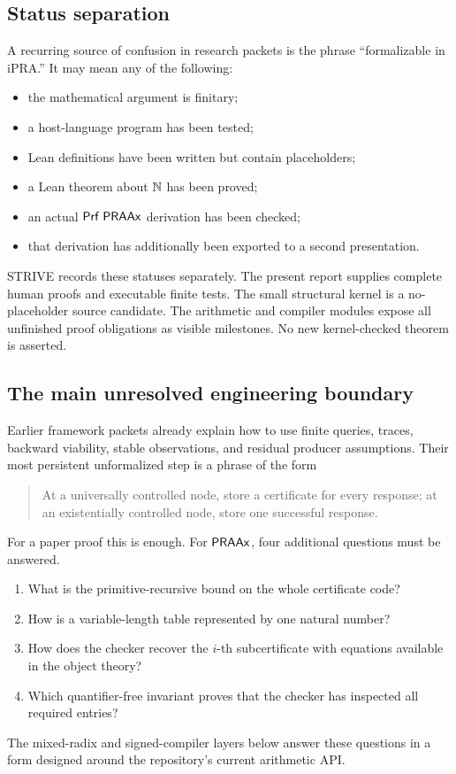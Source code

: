 \subsection{Status separation}

A recurring source of confusion in research packets is the phrase
``formalizable in iPRA.''  It may mean any of the following:

\begin{itemize}
\item the mathematical argument is finitary;
\item a host-language program has been tested;
\item Lean definitions have been written but contain placeholders;
\item a Lean theorem about \(\mathbb N\) has been proved;
\item an actual \(\mathsf{Prf}\;\mathsf{PRAAx}\) derivation has been checked;
\item that derivation has additionally been exported to a second presentation.
\end{itemize}

STRIVE records these statuses separately.  The present report supplies complete
human proofs and executable finite tests.  The small structural kernel is a
no-placeholder source candidate.  The arithmetic and compiler modules expose
all unfinished proof obligations as visible  milestones.  No new
kernel-checked theorem is asserted.

\subsection{The main unresolved engineering boundary}

Earlier framework packets already explain how to use finite queries, traces,
backward viability, stable observations, and residual producer assumptions.
Their most persistent unformalized step is a phrase of the form

\begin{quote}
At a universally controlled node, store a certificate for every response; at
an existentially controlled node, store one successful response.
\end{quote}

For a paper proof this is enough.  For \(\mathsf{PRAAx}\), four additional questions
must be answered.

\begin{enumerate}
\item What is the primitive-recursive bound on the whole certificate code?
\item How is a variable-length table represented by one natural number?
\item How does the checker recover the \(i\)-th subcertificate with equations
available in the object theory?
\item Which quantifier-free invariant proves that the checker has inspected
all required entries?
\end{enumerate}

The mixed-radix and signed-compiler layers below answer these questions in a
form designed around the repository's current arithmetic API.
